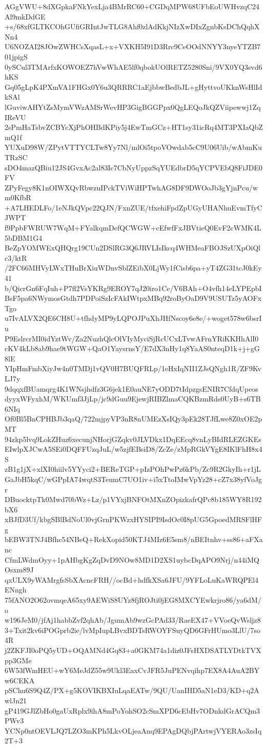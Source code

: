 AGgVWU+8dXGpkaFNkYexLja4BMrRC60+CGDqMPW68UFbEoUWHvzqC24Al9mkDdGE
+s/68xfGLTKCOhGUfiGRIntJwTLG8Ahf0zlAdKkjNIzXwDIxZgnbKsDChQqhXNn4
U6NOZAI28JOwZWHCsXqasL+x+VXKH5I91D3Rrc9CeOOdNNYY3nyeYTZB701jpigS
0ySCul3TMArfxKOWOEZ7hVwWhAE5lf0qbokUOlRETZ5280Sni/9VX0YQ3svd6hKS
Gq05gLpK4PXmVA1FHGx0Y6u3QRRRC1aEjbbwBedbJL+gHyttvoUKknWsHlIdkSAl
lGuviwAHYtZsMymVWzAMSrWevHP3GigBGGPpx0QgLEQoJkQZViipewwj1ZqIReVU
2sPmHaTsbvZCBYcXjPhOHBdKPiy5j4EwTmGCz+HT1sy31icRq4MT3PXIaQbZmQ1f
YUXuD98W/ZPytVTTYCLTw8Yy7Nl/mlOi5tpoVOwdab5cC9U06Uib/wAbmKuTRzSC
sDO4mazQBiu12JS4GvxAc2al83Ic7CbNyUppzSqYUEdbrD5qYCPVEbQ8FiJDE0FV
ZPyFegy8K1nOIWXQvRbwzuIPckTViWiHPTwhAG8DF9DWOoJb3gYjnPcu/wm0KfbR
+A7LHEDLFo/1eNJkQVpc22QJN/FxnZUE/tfxehiFpdZpUGyUHANhuEvmTfyCJWPT
f9PpbFWRUW7WqM+FYalkqmDefQCWGW+cEfwfFxJBVtieQ0EvF2cWMK4L5bDBM1G4
BeZpYOMWExQHQrg19CUn2DSlRG3Q6JRVLIsIkcq4WHMeaFBOJSzUXpOiQlc3/ktR
/2FC66MHVyLWxTHuBrXiuWDnvSblZEibX0LjWy1fCisb6pa+yT4ZG31tcJ0kEy41
b/QicrGn6FqIuh+P7fl2VsYKRg9EROY7qJ20iro1Ce/V6BAh+O4vfh14eLYPEpbI
BsF5pa6NWymosGtdh7PDPoiSzIcFAkIWtpxMBq92roByOaD9V9USUTz5yAOFxTgo
u7IvALVX2QE6CH8U+tfhdyMP9yLQPOJPuXhJHfNscoy6e8e/+woget578w6bsrIu
P9EslrcrMI0idYztWv/Za2NuzhQlcOlVIyMyciSjRcUCxLTvwAFrnYRiKKHhAlI0
cKV4kLb8ab9hae9tWGW+QaO1YaysrnsY/E7dX3nHy1q8YaAS0nteqD1k+j+gG8lE
YIpHmFmbXiyJw4n0TMDj1vQV0H7BUQFRLp/1eHxIqNII1ZJsQNgh1R/ZF9KvLJ7y
9dqqxfBUamqrg4K1WNsjhdfz3G6jek1E0auNE7yODD7tIdpzgsENIR7CfdqUpeos
dyyxWFyxhM/WKUmf3JjLp/jc9dGuu9EjewjRIBZlmaCQKBzmRds0UyB+s6TB6NIq
Of0Bl5BnCPHBJb3qaQ/722mjpyVP3nR8nUMEzXsIQy3pEk28TJfLwe8Z0xOE2pMT
94zkp5lvq9LokZHuz6xecunjNHorjGZqkv0JLVDkx1DqEEcq8vnLyBIdRLEZGKEs
EIwlpXJCwA5SEi0DQFFUzqJuL/w5zjfEBsiD8/ZcZe/zMpRGkVYgE8IKlFhH8x4S
zB1g1jX+xlXI0hiilv5YYyci2+BEReTGP+pIzPOhPwPz6kPb/Zc9R2GkyIh+r1jL
GaJbH5kqC/wGPpIA74wqtS3TeumC7UO1iv+i5xTtoIMwVpYz28+cZ7x38yfVoJgr
DBuocktpTk0Mwd70bWz+Lz/p1VYxjBNFOtMXnZOpizkafrQPc8b185WY8R192bX6
xBJfD3Uf/kbgSBlBdNoUl0vjGrnPKWzxHYSIPI9IsdOc0I8pUG5GpoedMRSFlHFg
bEBW3TNJ4Bfhc54NBeQ+RekXopid50KTJ4MIz6E5sm8/nBEItnhv+ss86+aFXanc
CfmLWdmOyy+1pAHbgKgZqDvD9NOw8MD1D2XS1uybcDqAPO9Nrj/n44iMQOsxm89J
qxULX9yWAMrgfsSbXAcncFRH//ocBd+hdfkXSa6JFU/9YFLoLuKaWRQPEl4ENngh
75fANO2O62ovmqeA65xy9AEWiS8UYz8fjROJti0jEG8MXCYEwkrjro86/ya6dM/o
w196JeM0/jfAj1habbZvf2qhAb/JgumAb9wzGcPAd33/RaeEX47+VVoeQvWsljz8
3+Txit2kv6iPOGprb2ie/lvMpIupLBvxBDTsRWOYFSuyQD6GFrHUmo3LlU/7so4R
j2ZKFJI0oPQ5yUD+OQAMNd4Gq83+a0GKM74a1diz0JFsHXDSATLYDtkTVXpp3GMe
6W53fWmHEU+wY6MeJdZ55w9Ukl3EaxCvJFR5JuPENvqihp7EX8A4AuA2BYw6CEKA
pSChu6S9Q4Z/PX+g5KOVIKBXIuLqaEATw/9QU/UanIHD5aN1eD3/KD+q2AwlJn21
gP419GJlZbHo0gaUxRplx9ihA8mPoYohSO2cSmXPD6cEbHv7ODnkdGrACQm3PWv3
YCNp0ntOEVLJQ7LZO3mKPh5LkvOLjeaAnq9EPAgDQbjPArtwjVYERAo3zsIq2T+3
